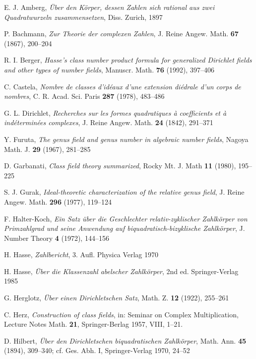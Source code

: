 \documentclass{amsart}
\begin{document}
\begin{thebibliography}{}

 E. J. Amberg,
{\em \"Uber den K\"orper, dessen Zahlen sich rational aus zwei
     Quadratwurzeln zusammensetzen}, Diss. Zurich, 1897
%

 P. Bachmann,
{\em Zur Theorie der complexen Zahlen},
J. Reine Angew. Math. {\bf 67} (1867), 200--204
%

 R. I. Berger,
{\em Hasse's class number product formula for generalized
   Dirichlet fields and other types of number fields},
Manuscr. Math. {\bf 76} (1992), 397--406
%

 C. Castela,
{\em Nombre de classes d'id\'eaux d'une extension di\'edrale
d'un corps de nombres}, C. R. Acad. Sci. Paris {\bf 287} (1978),
483--486
%

 G. L. Dirichlet,
{\em Recherches sur les formes quadratiques \`a coefficients
     et \`a ind\'etermin\'ees complexes},
J. Reine Angew. Math. {\bf 24} (1842), 291--371
%

 Y. Furuta,
{\em The genus field and genus number in algebraic number fields},
Nagoya Math. J. {\bf 29} (1967), 281--285
%

 D. Garbanati,
{\em Class field theory summarized},
Rocky Mt. J. Math {\bf 11} (1980), 195--225
%

 S. J. Gurak,
{\em Ideal-theoretic characterization of the relative genus field},
J. Reine Angew. Math. {\bf 296} (1977), 119--124
%

 F. Halter-Koch,
{\em Ein Satz \"uber die Geschlechter relativ-zyklischer Zahlk\"orper
   von Primzahlgrad und seine Anwendung auf biquadratisch-bizyklische
   Zahlk\"orper}, J. Number Theory {\bf 4} (1972), 144--156
%

 H. Hasse,
{\em Zahlbericht}, 3. Aufl. Physica Verlag 1970
%

 H. Hasse,
{\em \"Uber die Klassenzahl abelscher Zahlk\"orper},
2nd ed. Springer-Verlag 1985
%

 G. Herglotz,
{\em \"Uber einen Dirichletschen Satz},
Math. Z. {\bf 12} (1922), 255--261
%

 C. Herz,
{\em Construction of class fields}, in: Seminar on Complex
  Multiplication, Lecture Notes Math. {\bf 21}, Springer-Berlag
  1957, VIII, 1--21.
%

 D. Hilbert,
{\em \"Uber den Dirichletschen biquadratischen Zahlk\"orper},
Math. Ann. {\bf 45} (1894), 309--340; cf. Ges. Abh. I,
Springer-Verlag 1970, 24--52
%


\end{thebibliography}
\end{document}

